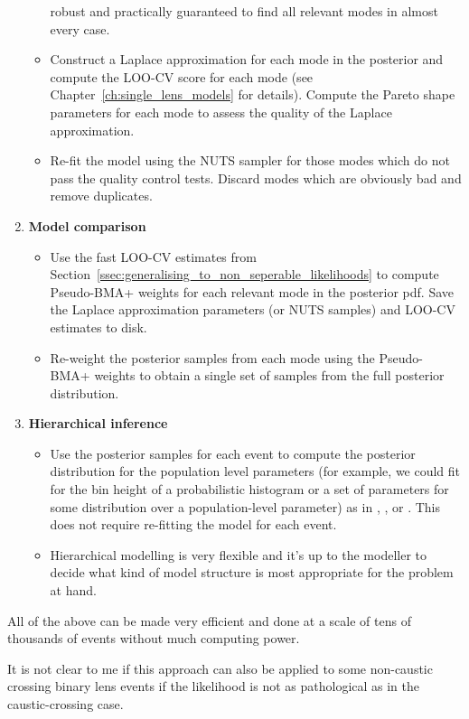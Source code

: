 \documentclass[12pt,dvipsnames]{report}
\begin{document}
\begin{enumerate}
\begin{itemize}
    robust and practically guaranteed to find all relevant modes in almost every case.
    \item Construct a Laplace approximation for each mode in the posterior 
    and compute the LOO-CV score for each mode (see Chapter~\ref{ch:single_lens_models} for 
    details). Compute the Pareto shape parameters for each mode to assess the quality 
    of the Laplace approximation. 
    \item Re-fit the model using the NUTS sampler for those modes
    which do not pass the quality control tests. Discard modes which are obviously bad 
    and remove duplicates.
    \end{itemize}
    \item \textbf{Model comparison} 
    \begin{itemize}
        \item Use the fast LOO-CV estimates from 
    Section~\ref{ssec:generalising_to_non_seperable_likelihoods} to compute Pseudo-BMA+ weights for each
    relevant mode in the posterior pdf. Save the Laplace approximation parameters (or NUTS samples)
    and LOO-CV estimates to disk. 
    \item Re-weight the posterior samples from each mode using the Pseudo-BMA+
    weights to obtain a single set of samples from the full posterior distribution.
    \end{itemize}
    \item \textbf{Hierarchical inference} 
    \begin{itemize}
    \item Use the posterior samples for each event to 
    compute the posterior distribution for the population level parameters (for example, we 
    could fit for the bin height of a probabilistic histogram or a set of parameters for some
    distribution over a population-level parameter) as in 
    \citet{golovich2022}, \citet{2014ApJ...795...64F}, or \citet{2010ApJ...725.2166H}.
    This does not require re-fitting the model for each event.
    \item Hierarchical modelling is very flexible and it's up to the modeller to decide what kind of 
    model structure is most appropriate for the problem at hand.
    \end{itemize}
\end{enumerate}
All of the above can be made very efficient and done at a scale of tens of thousands of 
events without much computing power. 

It is not clear to me if this approach
can also be applied to some non-caustic crossing binary lens events if the likelihood 
is not as pathological as in the caustic-crossing case.
\end{document}
